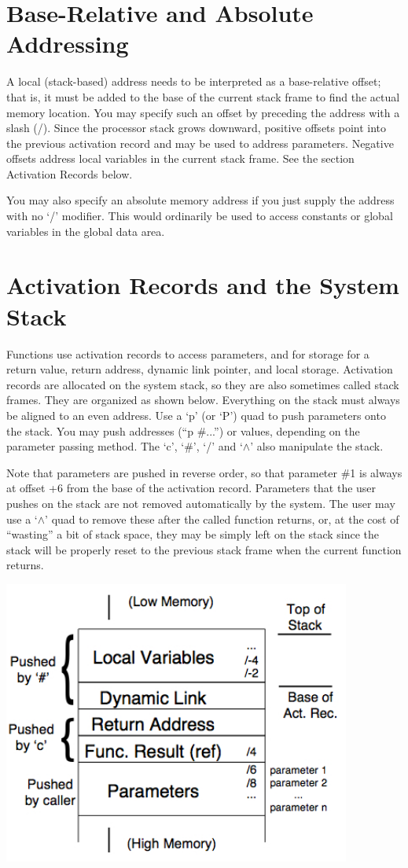 \documentclass[12pt]{article}
\begin{document}
\section*{Base-Relative and Absolute Addressing}
A local (stack-based) address needs to be interpreted as a base-relative offset; that is, it must be added to the base of the current stack frame to find the actual memory location. You may specify such an offset by preceding the address with a slash (/). Since the processor stack grows downward, positive offsets point into the previous activation record and may be used to address parameters. Negative offsets address local variables in the current stack frame. See the section Activation Records below.

You may also specify an absolute memory address if you just supply the address with no `/' modifier. This would ordinarily be used to access constants or global variables in the global data area.
\newpage
\section*{Activation Records and the System Stack}
     Functions use activation records to access parameters, and for storage for a return value, return address, dynamic
     link pointer, and local storage. Activation records are allocated on the system stack, so they are also sometimes 
     called stack frames. They are organized as shown below. Everything on the stack must always be aligned to an even
     address. Use a `p' (or `P') quad to push parameters onto the stack. You may push addresses (``p \#...'')
     or values, depending on the parameter passing method. The `c', `\#', `/' and `$\wedge$' also manipulate the stack.
     
     Note that parameters are pushed in reverse order, so that parameter \#1 is always at offset +6 from the base of the
     activation record. Parameters that the user pushes on the stack are not removed automatically by the system.
     The user may use a `$\wedge$' quad to remove these after the called function returns, or, at the cost of ``wasting'' a bit of
     stack space, they may be simply left on the stack since the stack will be properly reset to the previous
     stack frame when the current function returns.
     \vspace{1.5cm}
      \centerline{\includegraphics[width = 4.5in]{VMQ-stack-frame}}
     
\end{document}
